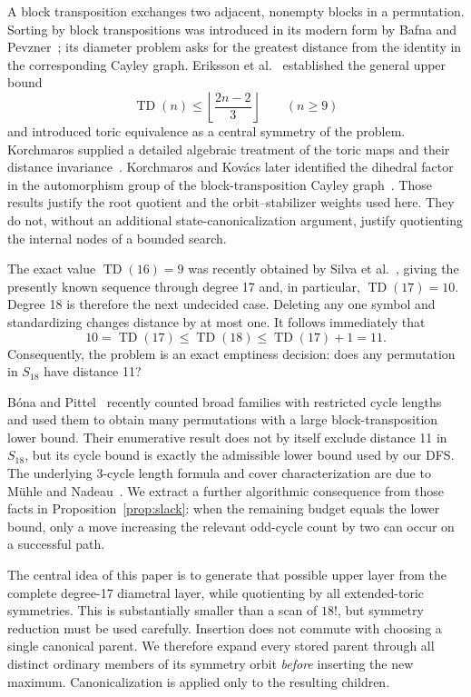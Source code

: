 \documentclass[11pt]{article}
\theoremstyle{definition}
\theoremstyle{remark}
\newcommand{\TD}{\operatorname{TD}}
\begin{document}
A block transposition exchanges two adjacent, nonempty blocks in a
permutation.  Sorting by block transpositions was introduced in its modern
form by Bafna and Pevzner~\cite{BafnaPevzner1998}; its diameter problem asks
for the greatest distance from the identity in the corresponding Cayley
graph.  Eriksson et al.~\cite{ErikssonEtAl2001} established the general upper
bound
\[
  \TD(n)\leq \left\lfloor\frac{2n-2}{3}\right\rfloor
  \qquad (n\geq9)
\]
and introduced toric equivalence as a central symmetry of the problem.
Korchmaros supplied a detailed algebraic treatment of the toric maps and
their distance invariance~\cite{Korchmaros2015,Korchmaros2014}.  Korchmaros
and Kov\'acs later identified the dihedral factor in the automorphism group
of the block-transposition Cayley graph~\cite{KorchmarosKovacs2017}.
Those results justify the root quotient and the orbit--stabilizer weights used
here.  They do not, without an additional state-canonicalization argument,
justify quotienting the internal nodes of a bounded search.

The exact value $\TD(16)=9$ was recently obtained by Silva et
al.~\cite{SilvaEtAl2026}, giving the presently known sequence through degree
17 and, in particular, $\TD(17)=10$.  Degree 18 is therefore the next
undecided case.  Deleting any one symbol and standardizing changes distance
by at most one.  It follows immediately that
\[
  10=\TD(17)\leq\TD(18)\leq\TD(17)+1=11.       \tag{1.1}
\]
Consequently, the problem is an exact emptiness decision: does any
permutation in $S_{18}$ have distance 11?

B\'ona and Pittel~\cite{BonaPittel2025} recently counted broad families with
restricted cycle lengths and used them to obtain many permutations with a
large block-transposition lower bound.  Their enumerative result does not by
itself exclude distance 11 in $S_{18}$, but its cycle bound is exactly the
admissible lower bound used by our DFS.  The underlying 3-cycle length formula
and cover characterization are due to M\"uhle and
Nadeau~\cite{MuhleNadeau2019}.  We extract a further algorithmic consequence
from those facts in Proposition~\ref{prop:slack}: when the remaining budget
equals the lower bound, only a move increasing the relevant odd-cycle count by
two can occur on a successful path.

The central idea of this paper is to generate that possible upper layer from
the complete degree-17 diametral layer, while quotienting by all
extended-toric symmetries.  This is substantially smaller than a scan of
$18!$, but symmetry reduction must be used carefully.  Insertion does not
commute with choosing a single canonical parent.  We therefore expand every
stored parent through all distinct ordinary members of its symmetry orbit
\emph{before} inserting the new maximum.  Canonicalization is applied only to
the resulting children.
\end{document}
